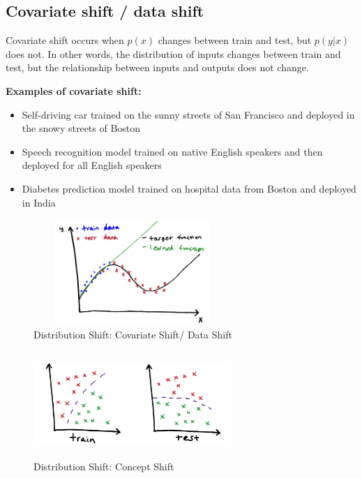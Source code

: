 \subsection{Covariate shift / data shift}\label{data_shift}
Covariate shift occurs when $p(x)$ changes between train and test, but $p(y|x)$ does not. In other words, the distribution of inputs changes between train and test, but the relationship between inputs and outputs does not change.

\vspace{0.2cm}
\textbf{Examples of covariate shift:}
\begin{itemize}
    \item Self-driving car trained on the sunny streets of San Francisco and deployed in the snowy streets of Boston
    \item Speech recognition model trained on native English speakers and then deployed for all English speakers
    \item Diabetes prediction model trained on hospital data from Boston and deployed in India
\end{itemize}

\begin{table}[H]
    \begin{minipage}{0.45\textwidth}
        \begin{figure}[H]
            \centering
            \includegraphics[width=7.5cm,height=4cm]{Pictures/ml-data/ml-data-covariate-shift.jpg}
            \caption{Distribution Shift: Covariate Shift/ Data Shift}
        \end{figure}
    \end{minipage}
    \hfill
    \begin{minipage}{0.45\textwidth}
        \begin{figure}[H]
            \centering
            \includegraphics[width=7.5cm,height=4cm]{Pictures/ml-data/ml-data-concept-shift.jpg}
            \caption{Distribution Shift: Concept Shift}
        \end{figure}
    \end{minipage}
\end{table}


